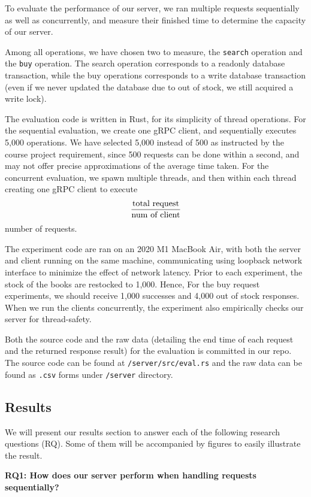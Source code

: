 \documentclass[letterpaper,11pt,twocolumn]{article}
\begin{document}
To evaluate the performance of our server, we ran multiple requests sequentially as well as concurrently, and measure their finished time to determine the capacity of our server.

Among all operations, we have chosen two to measure, the \texttt{search} operation and the \texttt{buy} operation. The search operation corresponds to a readonly database transaction, while the buy operations corresponds to a write database transaction (even if we never updated the database due to out of stock, we still acquired a write lock).

The evaluation code is written in Rust, for its simplicity of thread operations. For the sequential evaluation, we create one gRPC client, and sequentially executes 5,000 operations. We have selected 5,000 instead of 500 as instructed by the course project requirement, since 500 requests can be done within a second, and may not offer precise approximations of the average time taken.
For the concurrent evaluation, we spawn multiple threads, and then within each thread creating one gRPC client to execute $$\frac{\textnormal{total request}}{\textnormal{num of client}}$$ number of requests.

The experiment code are ran on an 2020 M1 MacBook Air, with both the server and client running on the same machine, communicating using loopback network interface to minimize the effect of network latency. Prior to each experiment, the stock of the books are restocked to 1,000. Hence, For the buy request experiments, we should receive 1,000 successes and 4,000 out of stock responses. When we run the clients concurrently, the experiment also empirically checks our server for thread-safety.

Both the source code and the raw data (detailing the end time of each request and the returned response result) for the evaluation is committed in our repo. The source code can be found at \texttt{/server/src/eval.rs} and the raw data can be found as \texttt{.csv} forms under \texttt{/server} directory.

\subsection{Results}

We will present our results section to answer each of the following research questions (RQ). Some of them will be accompanied by figures to easily illustrate the result.

\textbf{RQ1: How does our server perform when handling requests sequentially?}
\end{document}
